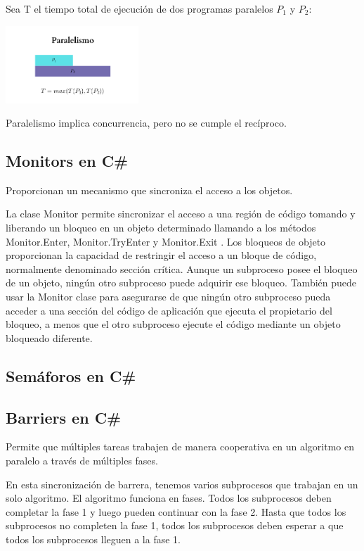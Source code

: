 \documentclass[10pt]{article} %
\begin{document}
Sea T el tiempo total de ejecuci\'on de dos programas paralelos $ P_{1} $ y $ P_{2} $:

\begin{center}
	\includegraphics[width=5cm]{paralelismo.png}
\end{center}

Paralelismo implica concurrencia, pero no se cumple el rec\'iproco.

\subsection{Monitors en C\#}
Proporcionan un mecanismo que sincroniza el acceso a los objetos.

La clase Monitor permite sincronizar el acceso a una región de código tomando y liberando un bloqueo en un objeto determinado llamando a los métodos Monitor.Enter, Monitor.TryEnter y Monitor.Exit . Los bloqueos de objeto proporcionan la capacidad de restringir el acceso a un bloque de código, normalmente denominado sección crítica. Aunque un subproceso posee el bloqueo de un objeto, ningún otro subproceso puede adquirir ese bloqueo. También puede usar la Monitor clase para asegurarse de que ningún otro subproceso pueda acceder a una sección del código de aplicación que ejecuta el propietario del bloqueo, a menos que el otro subproceso ejecute el código mediante un objeto bloqueado diferente.

\subsection{Sem\'aforos en C\#}

\subsection{Barriers en C\#}

Permite que múltiples tareas trabajen de manera cooperativa en un algoritmo en paralelo a través de múltiples fases.

En esta sincronización de barrera, tenemos varios subprocesos que trabajan en un solo algoritmo. El algoritmo funciona en fases. Todos los subprocesos deben completar la fase 1 y luego pueden continuar con la fase 2. Hasta que todos los subprocesos no completen la fase 1, todos los subprocesos deben esperar a que todos los subprocesos lleguen a la fase 1.
\end{document}
